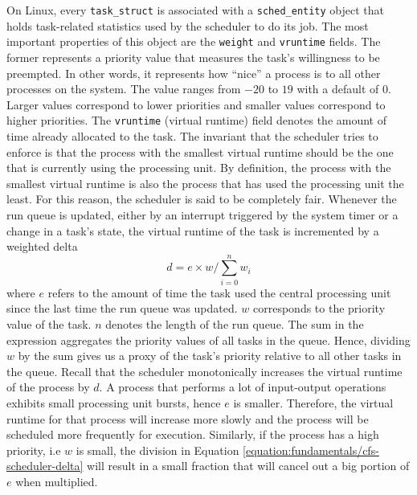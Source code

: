 On Linux, every \verb|task_struct| is associated with a \verb|sched_entity| object that holds task-related 
statistics used by the scheduler to do its job. The most important properties of this object 
are the \verb|weight| and \verb|vruntime| fields. The former represents 
a priority value that measures the task's willingness to be preempted. In other words, it represents 
how \enquote{nice} a process is to all other processes on the system. The value ranges from $-20$
to $19$ with a default of $0$. Larger values correspond to lower priorities and smaller values correspond 
to higher priorities. The \verb|vruntime| (virtual runtime) field denotes the amount of time already 
allocated to the task. The invariant that the scheduler tries to enforce is that the process with the 
smallest virtual runtime should be the one that is currently using the processing unit. By definition,
the process with the smallest virtual runtime is also the process that has used the processing unit
the least. For this reason, the scheduler is said to be completely fair. 
Whenever the run queue is updated, either by an interrupt triggered by the system timer or a 
change in a task's state, the virtual runtime of the task is incremented by a weighted delta
\begin{equation}
    d = e \times w / \sum_{i = 0}^{n} w_{i}
    \label{equation:fundamentals/cfs-scheduler-delta}
\end{equation}
where $e$ refers to the amount of time the task used the central processing unit 
since the last time the run queue was updated. 
$w$ corresponds to the priority value of the task. $n$ denotes the length of the run queue. 
The sum in the expression aggregates the priority values of all tasks in the queue. 
Hence, dividing $w$ by the sum gives us a proxy of the task's priority relative to all 
other tasks in the queue. Recall that the scheduler monotonically increases the virtual runtime 
of the process by $d$. A process that performs a lot of input-output operations exhibits small 
processing unit bursts, hence $e$ is smaller. Therefore, the virtual runtime for that process 
will increase more slowly and the process will be scheduled more frequently for execution. 
Similarly, if the process has a high priority, i.e $w$ is small, 
the division in Equation \ref{equation:fundamentals/cfs-scheduler-delta} will result in a small fraction 
that will cancel out a big portion of $e$ when multiplied. 


